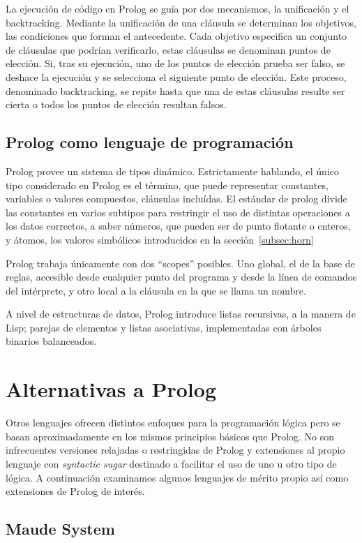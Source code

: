 \documentclass[11pt,captions=nooneline,DIV=14, parskip=full]{scrartcl}
\begin{document}
La ejecución de código en Prolog se guía por dos mecanismos, la unificación y el backtracking. Mediante la unificación de una cláusula se determinan los objetivos, las condiciones que forman el antecedente. Cada objetivo especifica un conjunto de cláusulas que podrían verificarlo, estas cláusulas se denominan puntos de elección. Si, tras su ejecución, uno de los puntos de elección prueba ser falso, se deshace la ejecución y se selecciona el siguiente punto de elección. Este proceso, denominado backtracking, se repite hasta que una de estas cláusulas resulte ser cierta o todos los puntos de elección resultan falsos.

\subsection{Prolog como lenguaje de programación}
Prolog provee un sistema de tipos dinámico. Estrictamente hablando, el único tipo considerado en Prolog es el término, que puede representar constantes, variables o valores compuestos, cláusulas incluídas. El estándar de prolog divide las constantes en varios subtipos para restringir el uso de distintas operaciones a los datos correctos, a saber números, que pueden ser de punto flotante o enteros, y átomos, los valores simbólicos introducidos en la sección~\ref{subsec:horn}

Prolog trabaja únicamente con dos ``scopes'' posibles. Uno global, el de la base de reglas, accesible desde cualquier punto del programa y desde la línea de comandos del intérprete, y otro local a la cláusula en la que se llama un nombre.

A nivel de estructuras de datos, Prolog introduce listas recursivas, a la manera de Lisp; parejas de elementos y listas asociativas, implementadas con árboles binarios balanceados.

\section{Alternativas a Prolog}
\label{sec:alt-prolog}
Otros lenguajes ofrecen distintos enfoques para la programación lógica pero se basan aproximadamente en los mismos principios básicos que Prolog. No son infrecuentes versiones relajadas o restringidas de Prolog y extensiones al propio lenguaje con \textit{syntactic sugar} destinado a facilitar el uso de uno u otro tipo de lógica. A continuación examinamos algunos lenguajes de mérito propio así como extensiones de Prolog de interés.

\subsection{Maude System}
\end{document}
